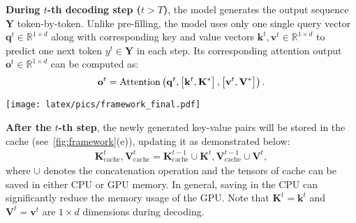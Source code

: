 \textbf{During $t$-th decoding step  ($t > T$)}, the model generates the output sequence $\mathbf{Y}$ token-by-token. Unlike pre-filling, the model uses only one single query vector $\mathbf{q}^{t} \in \mathbb{R}^{1 \times d}$ along with corresponding key and value vectors $\mathbf{k}^{t}, \mathbf{v}^{t} \in \mathbb{R}^{1 \times d}$ to predict one next token $y^{t} \in \mathbf{Y}$ in each step. Its corresponding attention output $\mathbf{o}^{t} \in \mathbb{R}^{1 \times d}$ can be computed as:
\begin{equation}
\vspace{-3pt}
\begin{aligned}
\mathbf{o}^{t} = \text{Attention}\left( \mathbf{q}^{t}, \left[ \mathbf{k}^{t}, \mathbf{K}^{*} \right], \left[ \mathbf{v}^{t}, \mathbf{V}^{*} \right] \right).
\end{aligned}
\end{equation}

\begin{figure*}[!ht] 
    \centering
        \texttt{[image: latex/pics/framework\_final.pdf]}
    \caption{. Sliding window attention stores historical KV pairs in a cache and reuses them for subsequent window inference. Based on this, \name first identifies the anchor tokens within the window and then constructs the activation-aware \pq. This \pq is subsequently used to retrieve the top-k relevant KV pairs from the cache during the pre-filling stage. During the decoding stage, the cut-off mechanism dynamically adjusts the number of recalled KV pairs based on the distribution of key-values at each layer, ensuring the inclusion of relevant pairs while minimizing the influence of irrelevant ones. The cache can be stored in the CPU and transferred to the GPU when needed. All our contributions are highlighted in {red}. }
    \label{fig:framework}
\vspace{-0.5em}
\end{figure*}

\textbf{After the $t$-th step}, the newly generated key-value pairs will be stored in the cache (see~\cref{fig:framework}(e)), updating it as demonstrated below:
\begin{equation}
\begin{aligned}
\mathbf{K}^{t}_{\text{cache}},\mathbf{V}^{t}_{\text{cache}} = \mathbf{K}^{t-1}_{\text{cache}}\cup \mathbf{K}^{t}, \mathbf{V}^{t-1}_{\text{cache}}\cup \mathbf{V}^{t},
\end{aligned}
\end{equation}
where $\cup$ denotes the concatenation operation and the tensors of cache can be saved in either CPU or GPU memory. In general, saving in the CPU can significantly reduce the memory usage of the GPU. Note that $\mathbf{K}^t=\mathbf{k}^t$ and $\mathbf{V}^t=\mathbf{v}^t$ are $1\times d$ dimensions during decoding.


